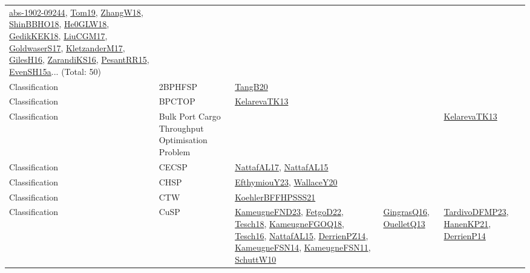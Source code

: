 {\begin{longtable}{lp{3cm}>{\raggedright}p{6cm}>{\raggedright}p{6cm}p{8cm}}
\href{articles/abs-1902-09244.pdf}{abs-1902-09244}\cite{abs-1902-09244}, \href{papers/Tom19.pdf}{Tom19}\cite{Tom19}, \href{articles/ZhangW18.pdf}{ZhangW18}\cite{ZhangW18}, \href{articles/ShinBBHO18.pdf}{ShinBBHO18}\cite{ShinBBHO18}, \href{papers/He0GLW18.pdf}{He0GLW18}\cite{He0GLW18}, \href{articles/GedikKEK18.pdf}{GedikKEK18}\cite{GedikKEK18}, \href{papers/LiuCGM17.pdf}{LiuCGM17}\cite{LiuCGM17}, \href{papers/GoldwaserS17.pdf}{GoldwaserS17}\cite{GoldwaserS17}, \href{papers/KletzanderM17.pdf}{KletzanderM17}\cite{KletzanderM17}, \href{papers/GilesH16.pdf}{GilesH16}\cite{GilesH16}, \href{articles/ZarandiKS16.pdf}{ZarandiKS16}\cite{ZarandiKS16}, \href{papers/PesantRR15.pdf}{PesantRR15}\cite{PesantRR15}, \href{articles/EvenSH15a.pdf}{EvenSH15a}\cite{EvenSH15a}... (Total: 50)\\
Classification & 2BPHFSP & \href{papers/TangB20.pdf}{TangB20}\cite{TangB20} &  & \\
Classification & BPCTOP & \href{papers/KelarevaTK13.pdf}{KelarevaTK13}\cite{KelarevaTK13} &  & \\
Classification & Bulk Port Cargo Throughput Optimisation Problem &  &  & \href{papers/KelarevaTK13.pdf}{KelarevaTK13}\cite{KelarevaTK13}\\
Classification & CECSP & \href{articles/NattafAL17.pdf}{NattafAL17}\cite{NattafAL17}, \href{articles/NattafAL15.pdf}{NattafAL15}\cite{NattafAL15} &  & \\
Classification & CHSP & \href{papers/EfthymiouY23.pdf}{EfthymiouY23}\cite{EfthymiouY23}, \href{articles/WallaceY20.pdf}{WallaceY20}\cite{WallaceY20} &  & \\
Classification & CTW & \href{articles/KoehlerBFFHPSSS21.pdf}{KoehlerBFFHPSSS21}\cite{KoehlerBFFHPSSS21} &  & \\
Classification & CuSP & \href{papers/KameugneFND23.pdf}{KameugneFND23}\cite{KameugneFND23}, \href{articles/FetgoD22.pdf}{FetgoD22}\cite{FetgoD22}, \href{papers/Tesch18.pdf}{Tesch18}\cite{Tesch18}, \href{papers/KameugneFGOQ18.pdf}{KameugneFGOQ18}\cite{KameugneFGOQ18}, \href{papers/Tesch16.pdf}{Tesch16}\cite{Tesch16}, \href{articles/NattafAL15.pdf}{NattafAL15}\cite{NattafAL15}, \href{papers/DerrienPZ14.pdf}{DerrienPZ14}\cite{DerrienPZ14}, \href{articles/KameugneFSN14.pdf}{KameugneFSN14}\cite{KameugneFSN14}, \href{papers/KameugneFSN11.pdf}{KameugneFSN11}\cite{KameugneFSN11}, \href{papers/SchuttW10.pdf}{SchuttW10}\cite{SchuttW10} & \href{papers/GingrasQ16.pdf}{GingrasQ16}\cite{GingrasQ16}, \href{papers/OuelletQ13.pdf}{OuelletQ13}\cite{OuelletQ13} & \href{papers/TardivoDFMP23.pdf}{TardivoDFMP23}\cite{TardivoDFMP23}, \href{papers/HanenKP21.pdf}{HanenKP21}\cite{HanenKP21}, \href{papers/DerrienP14.pdf}{DerrienP14}\cite{DerrienP14}\\

\end{longtable}}
